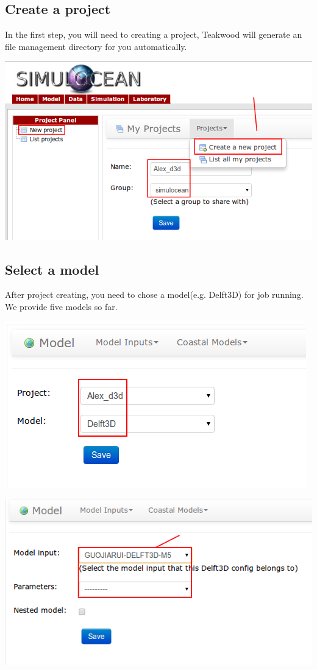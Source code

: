 \documentclass[letterpaper,10pt,openany, oneside]{sphinxmanual}
\begin{document}
\subsection{Create a \textbf{project}}
\label{demo:create-a-project}
In the first step, you will need to creating a project, Teakwood will generate an file management directory for you automatically.

{\hfill\includegraphics{cproject1.png}\hfill}


\subsection{Select a \textbf{model}}
\label{demo:select-a-model}
After project creating, you need to chose a model(e.g. Delft3D) for job running. We provide five models so far.

{\hfill\includegraphics{cmodel1.png}\hfill}

{\hfill\includegraphics{cmodel2.png}\hfill}
\end{document}

